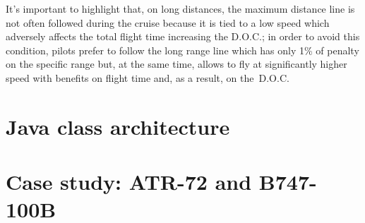 It's important to highlight that, on long distances, the maximum distance line is not often followed during the cruise because it is tied to a low speed which adversely affects the total flight time increasing the D.O.C.; in order to avoid this condition, pilots prefer to follow the long range line which has only 1\% of penalty on the specific range but, at the same time, allows to fly at significantly higher speed with benefits on flight time and, as a result, on the~D.O.C.

\section{Java class architecture}


\section{Case study: ATR-72 and B747-100B}
